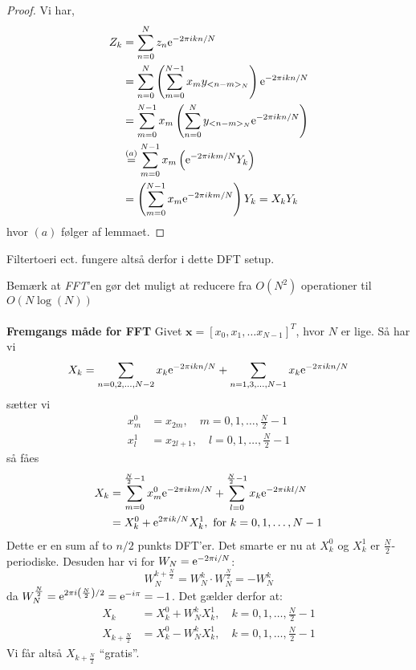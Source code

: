 \begin{proof}
  Vi har,
  \begin{align*}
    Z_{k} &= \sum_{n=0}^N z_{n} \mathrm{e}^{-2\pi i k n / N} \\
          &= \sum_{n=0}^N \left(\sum_{m=0}^{N-1} x_{m} y_{<n-m>_{N}}\right)
            \mathrm{e}^{-2\pi i k n/N} \\
          &= \sum_{m=0}^{N-1} x_{m} \left(\sum_{n=0}^N y_{<n-m>_{N}}\mathrm{e}^{-2\pi i k n/N}\right) \\
          &\stackrel{(a)}= \sum_{m=0}^{N-1} x_{m} \left(\mathrm{e}^{-2\pi i k m/N} Y_{k}\right) \\
          &= \left(\sum_{m=0}^{N-1} x_{m} \mathrm{e}^{-2\pi i k m/N} \right) Y_{k} = X_{k}Y_{k}
  \end{align*}
  hvor $(a)$ følger af lemmaet.
\end{proof}
\begin{remark}
  Filtertoeri ect. fungere altså derfor i dette DFT setup.
\end{remark}
Bemærk at \emph{FFT}'en gør det muligt at reducere fra $O(N^{2})$ operationer til $O(N \log(N))$ \\ \\
\textbf{Fremgangs måde for FFT} Givet $\mathbf{x} = [x_{0}, x_{1}, \ldots x_{N - 1}]^{T}$, hvor $N$ er lige. Så har vi
\begin{equation*}
  X_{k} = \sum_{n = 0, 2, \ldots, N - 2} x_{k}  \mathrm{e}^{-2\pi i k n / N} + \sum_{n = 1, 3, \ldots, N - 1} x_{k}  \mathrm{e}^{-2\pi i k n / N}
\end{equation*}
sætter vi
\begin{align*}
x_{m}^{0} &= x_{2m}, \quad m = 0, 1, \ldots, \frac{N}{2} - 1\\
x_{l}^{1} &= x_{2l + 1}, \quad l = 0, 1, \ldots , \frac{N}{2} - 1
\end{align*}
så fåes
\begin{align*}
  X_{k} &= \sum_{m = 0}^{\frac{N}{2} - 1} x^{0}_{m}  \mathrm{e}^{-2\pi i k m / N} + \sum_{l = 0}^{\frac{N}{2} - 1} x_{k}  \mathrm{e}^{-2\pi i k l / N} \\
  &= X_{k}^{0} + \mathrm{e}^{2\pi i k / N}X_{k}^{1}, \text{ for } k = 0, 1, \ldots, N - 1
\end{align*}
Dette er en sum af to $n/2$ punkts DFT'er.
Det smarte er nu at $X_{k}^{0}$ og $X_{k}^{1}$ er $\frac{N}{2}$-periodiske. Desuden har vi for $W_{N} = \mathrm{e}^{-2\pi i / N}$:
\begin{equation*}
  W^{k + \frac{N}{2}}_{N} = W_{N}^{k} \cdot W_{N}^{\frac{N}{2}} = -W_{N}^{k}
\end{equation*}
da $W_{N}^{\frac{N}{2}} = \mathrm{e}^{2\pi i \left(\frac{N}{2}\right) / 2} = \mathrm{e}^{- i \pi} = -1$.
Det gælder derfor at:
\begin{align*}
X_{k} &= X_{k}^{0} + W_{N}^{k}X_{k}^{1}, \quad k = 0, 1, \ldots, \frac{N}{2} - 1 \\
X_{k + \frac{N}{2}} &= X_{k}^{0} - W_{N}^{k}X_{k}^{1}, \quad k = 0, 1, \ldots, \frac{N}{2} - 1
\end{align*}
Vi får altså $X_{k + \frac{N}{2}}$ ``gratis''.
